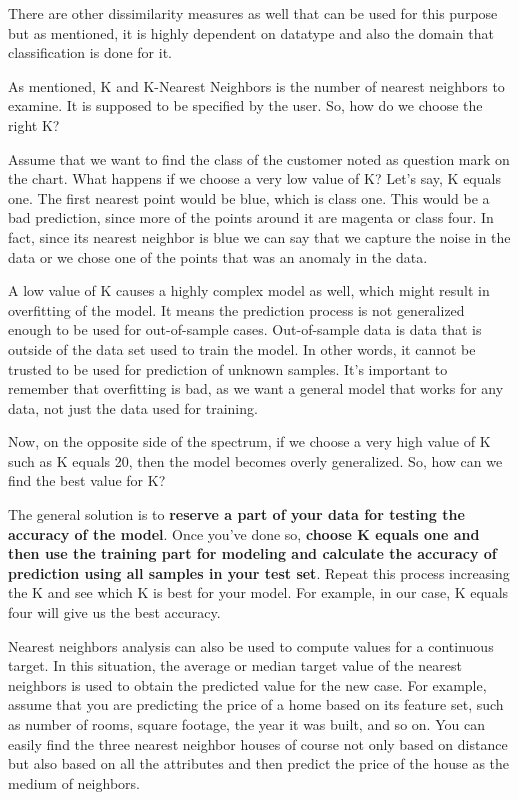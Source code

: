 	There are other dissimilarity measures as well that can be used for this purpose but as mentioned, it is highly dependent on datatype and also the domain that classification is done for it. 
	
	As mentioned, K and K-Nearest Neighbors is the number of nearest neighbors to examine. It is supposed to be specified by the user. So, how do we choose the right K? 
	
	Assume that we want to find the class of the customer noted as question mark on the chart. What happens if we choose a very low value of K? Let's say, K equals one. The first nearest point would be blue, which is class one. This would be a bad prediction, since more of the points around it are magenta or class four. In fact, since its nearest neighbor is blue we can say that we capture the noise in the data or we chose one of the points that was an anomaly in the data. 
	
	A low value of K causes a highly complex model as well, which might result in overfitting of the model. It means the prediction process is not generalized enough to be used for out-of-sample cases. Out-of-sample data is data that is outside of the data set used to train the model. In other words, it cannot be trusted to be used for prediction of unknown samples. It's important to remember that overfitting is bad, as we want a general model that works for any data, not just the data used for training.
	
	Now, on the opposite side of the spectrum, if we choose a very high value of K such as K equals 20, then the model becomes overly generalized. So, how can we find the best value for K? 
	
	The general solution is to \textbf{reserve a part of your data for testing the accuracy of the model}. Once you've done so, \textbf{choose K equals one and then use the training part for modeling and calculate the accuracy of prediction using all samples in your test set}. Repeat this process increasing the K and see which K is best for your model. For example, in our case, K equals four will give us the best accuracy. 
	
	Nearest neighbors analysis can also be used to compute values for a continuous target. In this situation, the average or median target value of the nearest neighbors is used to obtain the predicted value for the new case. For example, assume that you are predicting the price of a home based on its feature set, such as number of rooms, square footage, the year it was built, and so on. You can easily find the three nearest neighbor houses of course not only based on distance but also based on all the attributes and then predict the price of the house as the medium of neighbors. 
	
